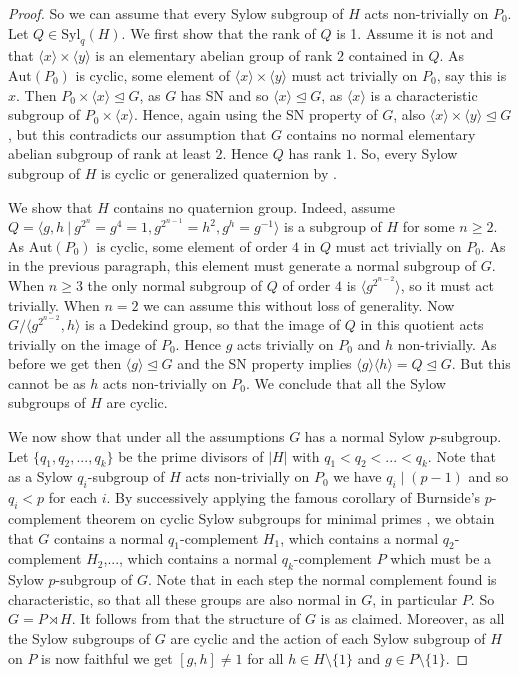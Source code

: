 \documentclass[a4paper,10pt]{amsart}
\theoremstyle{definition}
\theoremstyle{remark}
\begin{document}
\begin{proof}
So we can assume that every Sylow subgroup of $H$ acts non-trivially on $P_0$. Let $Q \in \text{Syl}_q(H)$. We first show that the rank of $Q$ is 1. Assume it is not and that $\langle x \rangle \times \langle y \rangle$ is an elementary abelian group of rank $2$ contained in $Q$. As $\text{Aut}(P_0)$ is cyclic, some element of $\langle x \rangle \times \langle y \rangle$ must act trivially on $P_0$, say this is $x$. Then $P_0 \times \langle x \rangle \unlhd G$, as $G$ has SN and so $\langle x \rangle \unlhd G$, as $\langle x \rangle$ is a characteristic subgroup of $P_0 \times \langle x \rangle$. Hence, again using the SN property of $G$, also $\langle x \rangle \times \langle y \rangle \unlhd G$, but this contradicts our assumption that $G$ contains no normal elementary abelian subgroup of rank at least $2$. Hence $Q$ has rank $1$. So, every Sylow subgroup of $H$ is cyclic or generalized quaternion by . 

We show that $H$ contains no quaternion group. Indeed, assume $Q = \langle g,h \ | \ g^{2^n} = g^4 = 1, g^{2^{n-1}} = h^2, g^h = g^{-1} \rangle$ is a subgroup of $H$ for some $n \geq 2$. As $\text{Aut}(P_0)$ is cyclic, some element of order $4$ in $Q$ must act trivially on $P_0$. As in the previous paragraph, this element must generate a normal subgroup of $G$. When $n \geq 3$ the only normal subgroup of $Q$ of order $4$ is $\langle g^{2^{n-2}} \rangle$, so it must act trivially. When $n=2$ we can assume this without loss of generality. 
Now $G/\langle g^{2^{n-2}}, h\rangle$ is a Dedekind group, so that the image of $Q$ in this quotient acts trivially on the image of $P_0$. Hence $g$ acts trivially on $P_0$ and $h$ non-trivially.
As before we get then $\langle g \rangle \unlhd G$ and the SN property implies $\langle g \rangle \langle h \rangle = Q \unlhd G$. But this cannot be as $h$ acts non-trivially on $P_0$. We conclude that all the Sylow subgroups of $H$ are cyclic.

We now show that under all the assumptions $G$ has a normal Sylow $p$-subgroup. Let $\{q_1,q_2,...,q_k \}$ be the prime divisors of $|H|$ with $q_1 < q_2 < ... < q_k$. Note that as a Sylow $q_i$-subgroup of $H$ acts non-trivially on $P_0$ we have $q_i \mid (p-1)$ and so $q_i < p$ for each $i$. By successively applying the famous corollary of Burnside's $p$-complement theorem on cyclic Sylow subgroups for minimal primes \cite[IV, Satz 2.8]{Huppert}, we obtain that $G$ contains a normal $q_1$-complement $H_1$, which contains a normal $q_2$-complement $H_2$,..., which contains a normal $q_k$-complement $P$ which must be a Sylow $p$-subgroup of $G$. Note that in each step the normal complement found is characteristic, so that all these groups are also normal in $G$, in particular $P$. So $G = P \rtimes H$. It follows from  that the structure of $G$ is as claimed. Moreover, as all the Sylow subgroups of $G$ are cyclic and the action of each Sylow subgroup of $H$ on $P$ is now faithful we get $[g,h] \neq 1$ for all $h \in H \setminus \{1\}$ and $g \in P \setminus \{1\}$.


\end{proof}
\end{document}

